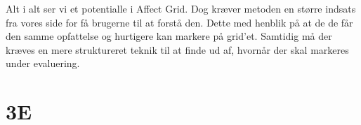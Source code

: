 Alt i alt ser vi et potentialle i Affect Grid. Dog kræver metoden en større indsats fra vores side for få brugerne til at forstå den. Dette med henblik på at de de får den samme opfattelse og hurtigere kan markere på grid'et. Samtidig må der kræves en mere struktureret teknik til at finde ud af, hvornår der skal markeres under evaluering.  


\section{3E}\label{sec:eval3E}
